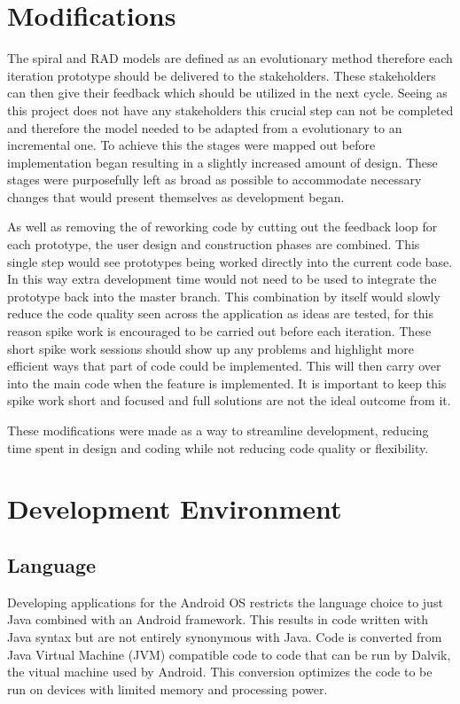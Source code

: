 \section{Modifications}
The spiral and RAD models are defined as an evolutionary method therefore each iteration prototype should be delivered to the stakeholders. These stakeholders can then give their feedback which should be utilized in the next cycle. Seeing as this project does not have any stakeholders this crucial step can not be completed and therefore the model needed to be adapted from a evolutionary to an incremental one. To achieve this the stages were mapped out before implementation began resulting in a slightly increased amount of design. These stages were purposefully left as broad as possible to accommodate necessary changes that would present themselves as development began.

As well as removing the of reworking code by cutting out the feedback loop for each prototype, the user design and construction phases are combined. This single step would see prototypes being worked directly into the current code base. In this way extra development time would not need to be used to integrate the prototype back into the master branch. This combination by itself would slowly reduce the code quality seen across the application as ideas are tested, for this reason spike work is encouraged to be carried out before each iteration. These short spike work sessions should show up any problems and highlight more efficient ways that part of code could be implemented. This will then carry over into the main code when the feature is implemented. It is important to keep this spike work short and focused and full solutions are not the ideal outcome from it.

These modifications were made as a way to streamline development, reducing time spent in design and coding while not reducing code quality or flexibility.




\section{Development Environment}

\subsection{Language}
Developing applications for the Android OS restricts the language choice to just Java combined with an Android framework. This results in code written with Java syntax but are not entirely synonymous with Java. Code is converted from Java Virtual Machine (JVM) compatible code to code that can be run by Dalvik, the vitual machine used by Android. This conversion optimizes the code to be run on devices with limited memory and processing power.

